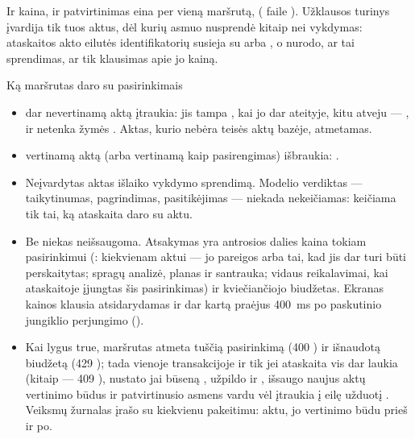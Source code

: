 Ir kaina, ir patvirtinimas eina per vieną maršrutą, 
( faile ). Užklausos turinys įvardija tik tuos
aktus, dėl kurių asmuo nusprendė kitaip nei vykdymas:  ataskaitos akto eilutės
identifikatorių susieja su  arba , o  nurodo, ar tai
sprendimas, ar tik klausimas apie jo kainą.

\begin{codebox}{Ką maršrutas daro su pasirinkimais}
\begin{itemize}
  \item {} dar nevertinamą aktą įtraukia: jis tampa , kai jo
     dar ateityje, kitu atveju --- , ir netenka žymės
    . Aktas, kurio nebėra teisės aktų bazėje, atmetamas.
  \item {} vertinamą aktą (arba vertinamą kaip pasirengimas) išbraukia:
    .
  \item Neįvardytas aktas išlaiko vykdymo sprendimą. Modelio verdiktas --- taikytinumas,
    pagrindimas, pasitikėjimas --- niekada nekeičiamas: keičiama tik tai, ką ataskaita daro su
    aktu.
  \item Be  niekas neišsaugoma. Atsakymas yra antrosios dalies kaina tokiam
    pasirinkimui (: kiekvienam aktui --- jo pareigos arba tai, kad jis dar
    turi būti perskaitytas; spragų analizė, planas ir santrauka; vidaus reikalavimai, kai
    ataskaitoje įjungtas šis pasirinkimas) ir kviečiančiojo biudžetas. Ekranas kainos klausia
    atsidarydamas ir dar kartą praėjus 400~ms po paskutinio jungiklio perjungimo
    ().
  \item Kai  lygus true, maršrutas atmeta tuščią pasirinkimą (400
    ) ir išnaudotą biudžetą (429 ); tada vienoje
    transakcijoje ir tik jei ataskaita vis dar laukia (kitaip --- 409 ),
    nustato jai būseną , užpildo  ir
    , išsaugo naujus aktų vertinimo būdus ir patvirtinusio asmens vardu
    vėl įtraukia į eilę užduotį . Veiksmų žurnalas įrašo
     su kiekvienu pakeitimu: aktu, jo vertinimo būdu prieš ir po.
\end{itemize}
\end{codebox}

